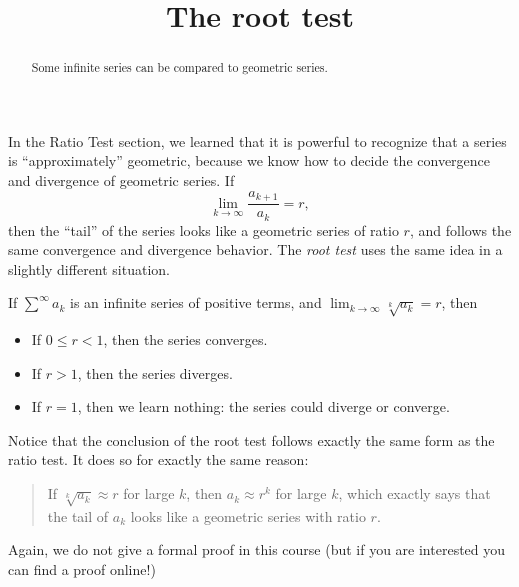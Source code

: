 \documentclass{ximera}
\title[Dig-In:]{The root test}
\begin{document}
\begin{abstract}
Some infinite series can be compared to geometric series.
\end{abstract}
\maketitle

In the Ratio Test section, we learned that it is powerful to recognize
that a series is ``approximately'' geometric, because we know how to
decide the convergence and divergence of geometric series.  If
\[
\lim_{k \to \infty} \frac{a_{k+1}}{a_k} = r,
\]
then the ``tail'' of the series looks like a geometric series of ratio
$r$, and follows the same convergence and divergence behavior.  The
\textit{root test} uses the same idea in a slightly different
situation.
\begin{theorem}
  If $\sum^\infty a_k$ is an infinite series of positive terms, and $\lim_{k \to \infty} \sqrt[k]{a_k} = r$, then 
  \begin{itemize}
  \item If $0 \leq r < 1$, then the series converges.
  \item If $r>1$, then the series diverges.
  \item If $r = 1$, then we learn nothing:  the series could diverge or converge.
  \end{itemize}
\end{theorem}
Notice that the conclusion of the root test follows exactly the same
form as the ratio test.  It does so for exactly the same reason:
\begin{quote}
  If $\sqrt[k]{a_k} \approx r$ for large $k$, then $a_k \approx r^k$
  for large $k$, which exactly says that the tail of $a_k$ looks like
  a geometric series with ratio $r$.
\end{quote}
Again, we do not give a formal proof in this course (but if you are
interested you can find a proof online!)
\end{document}
